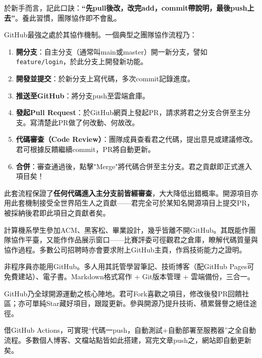 於新手而言，記此口訣：\textbf{“先pull後改，改完add，commit帶說明，最後push上去”}。養此習慣，團隊協作即不會亂。


GitHub最強之處於其協作機制。一個典型之團隊協作流程乃：

\begin{enumerate}
  \item \textbf{開分支}：自主分支（通常叫main或master）開一新分支，譬如\texttt{feature/\allowbreak login}，於此分支上開發新功能。
  \item \textbf{開發並提交}：於新分支上寫代碼，多次commit記錄進度。
  \item \textbf{推送至GitHub}：將分支push至雲端倉庫。
  \item \textbf{發起Pull Request}：於GitHub網頁上發起PR，請求將君之分支合併至主分支。寫清楚此PR做了何改動、何故改。
  \item \textbf{代碼審查（Code Review）}：團隊成員查看君之代碼，提出意見或建議修改。君可根據反饋繼續commit，PR將自動更新。
  \item \textbf{合併}：審查通過後，點擊"Merge"將代碼合併至主分支。君之貢獻即正式進入項目矣！
\end{enumerate}

此套流程保證了\textbf{任何代碼進入主分支前皆經審查}，大大降低出錯概率。開源項目亦用此套機制接受全世界陌生人之貢獻——君完全可於某知名開源項目上提交PR，被採納後君即此項目之貢獻者矣。



計算機系學生參加ACM、黑客松、畢業設計，幾乎皆離不開GitHub。其既能作團隊協作平臺，又能作作品展示窗口——比賽評委可徑觀君之倉庫，瞭解代碼質量與協作過程。多數公司招聘時亦會要求附上GitHub主頁，作爲技術能力之證明。


非程序員亦能用GitHub。多人用其託管學習筆記、技術博客（配GitHub Pages可免費建站）、電子書。Markdown格式寫作 + Git版本管理 + 雲端備份，三合一。


GitHub乃全球開源運動之核心陣地。君可Fork喜歡之項目，修改後發PR回饋社區；亦可單純Star藏好項目，跟蹤更新。參與開源乃提升技術、積累聲譽之絕佳途徑。


借GitHub Actions，可實現“代碼一push，自動測試+自動部署至服務器”之全自動流程。多數個人博客、文檔站點皆如此搭建，寫完文章push之，網站即自動更新矣。

